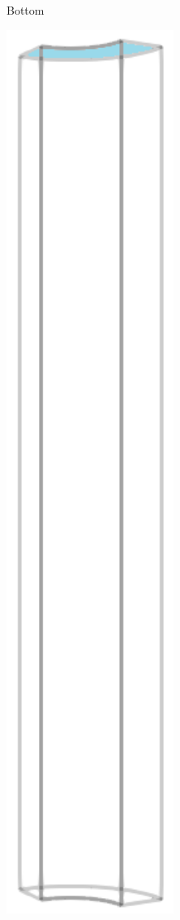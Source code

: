 \begin{figure}[!htb]
\begin{subfigure}{0.19\textwidth}
    \caption{Bottom}
  \end{subfigure}
  \begin{subfigure}{0.19\textwidth}
    \centering
    \includegraphics[width=0.6\textwidth]{Chapter5/figures/spallation/geometry_top}

\end{subfigure}
\end{figure}
